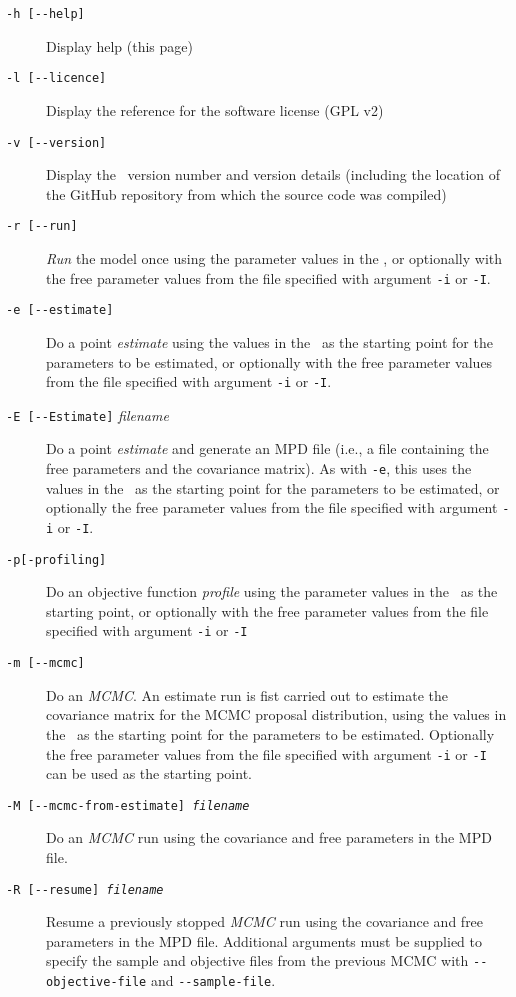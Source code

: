 \begin{description}
\item [\texttt{-h [-{}-help]}] Display help (this page)
\item [\texttt{-l [-{}-licence]}] Display the reference for the software license (GPL v2)
\item [\texttt{-v [-{}-version]}] Display the \CNAME\ version number and version details (including the location of the GitHub repository from which the source code was compiled)

\item [\texttt{-r [-{}-run]}] \emph{Run} the model once using the parameter values in the \config, or optionally with the free parameter values from the file specified with argument \texttt{-i} or \texttt{-I}.
\item [\texttt{-e [-{}-estimate]}] Do a point \emph{estimate} using the values in the \config\ as the starting point for the parameters to be estimated, or optionally with the free parameter values from the file specified with argument \texttt{-i} or \texttt{-I}.
\item [\texttt{-E [-{}-Estimate]} \emph{filename}] Do a point \emph{estimate} and generate an MPD file (i.e., a file containing the free parameters and the covariance matrix). As with \texttt{-e}, this uses the values in the \config\ as the starting point for the parameters to be estimated, or optionally the free parameter values from the file specified with argument \texttt{-i} or \texttt{-I}.
\item [\texttt{-{p}[-profiling]}] Do an objective function \emph{profile} using the parameter values in the \config\ as the starting point, or optionally with the free parameter values from the file specified with argument \texttt{-i} or \texttt{-I}
\item [\texttt{-m [-{}-mcmc]}] Do an \emph{MCMC}. An estimate run is fist carried out to estimate the covariance matrix for the MCMC proposal distribution, using the values in the \config\ as the starting point for the parameters to be estimated. Optionally the free parameter values from the file specified with argument \texttt{-i} or \texttt{-I} can be used as the starting point.
\item [\texttt{-M [-{}-mcmc-from-estimate] \emph{filename}}] Do an \emph{MCMC} run using the covariance and free parameters in the MPD file.
\item [\texttt{-R [-{}-resume] \emph{filename}}] Resume a previously stopped \emph{MCMC} run using the covariance and free parameters in the MPD file. Additional arguments must be supplied to specify the sample and objective files from the previous MCMC with \texttt{-{}-objective-file} and \texttt{-{}-sample-file}.

\end{description}
